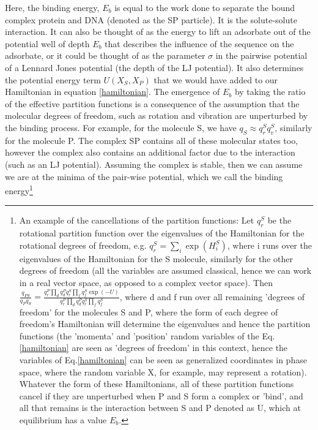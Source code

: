Here, the binding energy, $E_b$ is equal to the work done to separate the bound complex protein and DNA (denoted as the SP particle). It is the solute-solute interaction.  It can also be thought of as the energy to lift an adsorbate out of the potential well of depth $E_b$ that describes the influence of the sequence on the adsorbate, or it could be thought of as the parameter $\sigma$ in the pairwise potential of a Lennard Jones potential (the depth of the LJ potential).  It also determines the potential energy term $U(X_S,X_P)$ that we would have added to our Hamiltonian in equation \eqref{hamiltonian}.  The emergence of $E_b$ by taking the ratio of the effective partition functions is a consequence of the assumption that the molecular degrees of freedom, such as rotation and vibration are unperturbed by the binding process.  For example, for the molecule S, we have $q_S \approx q_r^S q_v^S$, similarly for the molecule P.  The complex SP contains all of these molecular states too, however the complex also contains an additional factor due to the interaction (such as an LJ potential).  Assuming the complex is stable, then we can assume we are at the minima of the pair-wise potential, which we call the binding energy\footnote{ An example of the cancellations of the partition functions: Let $q_r^S$ be the rotational partition function over the eigenvalues of the Hamiltonian for the rotational degrees of freedom, e.g. $q_r^S=\sum_i \exp( H_i^S )$, where i runs over the eigenvalues of the Hamiltonian for the S molecule, similarly for the other degrees of freedom (all the variables are assumed classical, hence we can work in a real vector space, as opposed to a complex vector space).  Then $\frac{q_{PS}}{q_P q_S}= \frac{q_r^P \prod_d q_d^P q_r^S \prod_f q_f^S \exp(-U)}{q_r^P \prod_d q_d^P q_r^S \prod_f q_f^S }$, where d and f run over all remaining 'degrees of freedom' for the molecules S and P, where the form of each degree of freedom's Hamiltonian will determine the eigenvalues and hence the partition functions (the 'momenta' and 'position' random variables of the Eq.\ref{hamiltonian} are seen as 'degrees of freedom'\cite{hobson} in this context, hence the variables of Eq.\ref{hamiltonian} can be seen as generalized coordinates in phase space, where the random variable X, for example, may represent a rotation).  Whatever the form of these Hamiltonians, all of these partition functions cancel if they are unperturbed when P and S form a complex or 'bind', and all that remains is the interaction between S and P denoted as U, which at equilibrium has a value $E_b$.  } 

